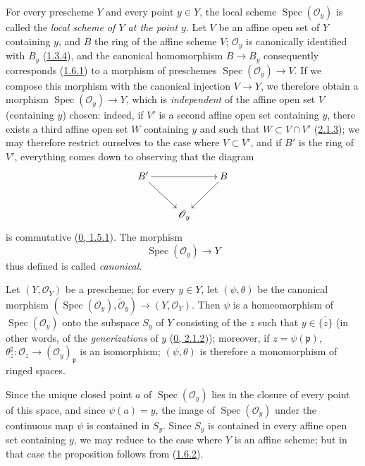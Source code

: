 For every prescheme $Y$ and every point $y\in Y$, the local scheme
$\operatorname{Spec}(\mathscr{O}_y)$ is called the \emph{local scheme of $Y$
at the point $y$}. Let $V$ be an affine open set of $Y$ containing $y$, and
$B$ the ring of the affine scheme $V$; $\mathscr{O}_y$ is canonically
identified with $B_y$ (\hyperref[I.1.3.4]{1.3.4}), and the canonical
homomorphism $B\to B_y$ consequently corresponds
(\hyperref[I.1.6.1]{1.6.1}) to a morphism of
preschemes $\operatorname{Spec}(\mathscr{O}_y)\to V$. If we compose this
morphism with the canonical injection $V\to Y$, we therefore obtain a
morphism $\operatorname{Spec}(\mathscr{O}_y)\to Y$, which is
\emph{independent} of the affine open set $V$ (containing $y$) chosen:
indeed, if $V'$ is a second affine open set containing $y$, there exists a
third affine open set $W$ containing $y$ and such that $W\subset V\cap V'$
(\hyperref[I.2.1.3]{2.1.3}); we may therefore restrict ourselves to the
case where $V\subset V'$, and if $B'$ is the ring of $V'$, everything comes
down to observing that the diagram
\label{I.2.4.1.diagram}
\[
  \xymatrix{
    B'\ar[rr]\ar[dr] & & B\ar[dl]\\
    & \mathscr{O}_y
  }
\]
is commutative (\hyperref[0.1.5.1]{0, 1.5.1}). The morphism
\[
  \operatorname{Spec}(\mathscr{O}_y)\to Y
\]
thus defined is called \emph{canonical}.

\begin{proposition}[2.4.2]
\label{I.2.4.2}
Let $(Y,\mathscr{O}_Y)$ be a prescheme; for every $y\in Y$, let
$(\psi,\theta)$ be the canonical morphism
$(\operatorname{Spec}(\mathscr{O}_y),\widetilde{\mathscr{O}}_y)
\to(Y,\mathscr{O}_Y)$. Then $\psi$ is a homeomorphism of
$\operatorname{Spec}(\mathscr{O}_y)$ onto the subspace $S_y$ of $Y$
consisting of the $z$ such that $y\in\overline{\{z\}}$ (in other words, of
the \emph{generizations} of $y$ (\hyperref[0.2.1.2]{0, 2.1.2}));
moreover, if $z=\psi(\mathfrak{p})$,
$\theta_z^{\sharp}:\mathscr{O}_z\to(\mathscr{O}_y)_{\mathfrak{p}}$ is an
isomorphism; $(\psi,\theta)$ is therefore a monomorphism of ringed spaces.
\end{proposition}

Since the unique closed point $a$ of $\operatorname{Spec}(\mathscr{O}_y)$
lies in the closure of every point of this space, and since $\psi(a)=y$, the
image of $\operatorname{Spec}(\mathscr{O}_y)$ under the continuous map $\psi$
is contained in $S_y$. Since $S_y$ is contained in every affine open set
containing $y$, we may reduce to the case where $Y$ is an affine scheme; but
in that case the proposition follows from
(\hyperref[I.1.6.2]{1.6.2}).

